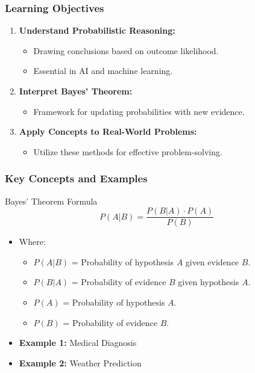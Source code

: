 \documentclass[aspectratio=169]{beamer}
\begin{document}
\begin{frame}[fragile]
  \frametitle{Learning Objectives}
  \begin{enumerate}
    \item \textbf{Understand Probabilistic Reasoning:} 
      \begin{itemize}
        \item Drawing conclusions based on outcome likelihood.
        \item Essential in AI and machine learning.
      \end{itemize}
    \item \textbf{Interpret Bayes' Theorem:}
      \begin{itemize}
        \item Framework for updating probabilities with new evidence.
      \end{itemize}
    \item \textbf{Apply Concepts to Real-World Problems:}
      \begin{itemize}
        \item Utilize these methods for effective problem-solving.
      \end{itemize}
  \end{enumerate}
\end{frame}

\begin{frame}[fragile]
  \frametitle{Key Concepts and Examples}
  \begin{block}{Bayes' Theorem Formula}
    \begin{equation}
    P(A|B) = \frac{P(B|A) \cdot P(A)}{P(B)}
    \end{equation}
    \begin{itemize}
      \item Where:
      \begin{itemize}
        \item $P(A|B)$ = Probability of hypothesis $A$ given evidence $B$.
        \item $P(B|A)$ = Probability of evidence $B$ given hypothesis $A$.
        \item $P(A)$ = Probability of hypothesis $A$.
        \item $P(B)$ = Probability of evidence $B$.
      \end{itemize}
    \end{itemize}
  \end{block}

  \begin{itemize}
    \item \textbf{Example 1:} Medical Diagnosis
    \item \textbf{Example 2:} Weather Prediction
  \end{itemize}
\end{frame}
\end{document}
